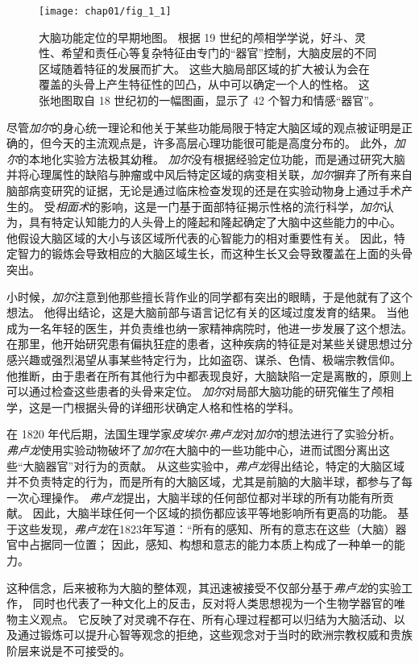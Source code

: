 \begin{figure}[htbp]
	\centering
	\texttt{[image: chap01/fig\_1\_1]}
	\caption{大脑功能定位的早期地图。
		根据 19 世纪的颅相学学说，好斗、灵性、希望和责任心等复杂特征由专门的“器官”控制，大脑皮层的不同区域随着特征的发展而扩大。
		这些大脑局部区域的扩大被认为会在覆盖的头骨上产生特征性的凹凸，从中可以确定一个人的性格。
		这张地图取自 18 世纪初的一幅图画，显示了 42 个智力和情感“器官”。}
	\label{fig:1_1}
\end{figure}


尽管\textit{加尔}的身心统一理论和他关于某些功能局限于特定大脑区域的观点被证明是正确的，但今天的主流观点是，许多高层心理功能很可能是高度分布的。
此外，\textit{加尔}的本地化实验方法极其幼稚。
\textit{加尔}没有根据经验定位功能，而是通过研究大脑并将心理属性的缺陷与肿瘤或中风后特定区域的病变相关联，\textit{加尔}摒弃了所有来自脑部病变研究的证据，无论是通过临床检查发现的还是在实验动物身上通过手术产生的。
受\textit{相面术}的影响，这是一门基于面部特征揭示性格的流行科学，\textit{加尔}认为，具有特定认知能力的人头骨上的隆起和隆起确定了大脑中这些能力的中心。
他假设大脑区域的大小与该区域所代表的心智能力的相对重要性有关。
因此，特定智力的锻炼会导致相应的大脑区域生长，而这种生长又会导致覆盖在上面的头骨突出。


小时候，\textit{加尔}注意到他那些擅长背作业的同学都有突出的眼睛，于是他就有了这个想法。
他得出结论，这是大脑前部与语言记忆有关的区域过度发育的结果。
当他成为一名年轻的医生，并负责维也纳一家精神病院时，他进一步发展了这个想法。
在那里，他开始研究患有偏执狂症的患者，这种疾病的特征是对某些关键思想过分感兴趣或强烈渴望从事某些特定行为，比如盗窃、谋杀、色情、极端宗教信仰。
他推断，由于患者在所有其他行为中都表现良好，大脑缺陷一定是离散的，原则上可以通过检查这些患者的头骨来定位。
\textit{加尔}对局部大脑功能的研究催生了颅相学，这是一门根据头骨的详细形状确定人格和性格的学科。


在 1820 年代后期，法国生理学家\textit{皮埃尔$\cdot$弗卢龙}对\textit{加尔}的想法进行了实验分析。 
\textit{弗卢龙}使用实验动物破坏了\textit{加尔}在大脑中的一些功能中心，进而试图分离出这些“大脑器官”对行为的贡献。
从这些实验中，\textit{弗卢龙}得出结论，特定的大脑区域并不负责特定的行为，而是所有的大脑区域，尤其是前脑的大脑半球，都参与了每一次心理操作。
\textit{弗卢龙}提出，大脑半球的任何部位都对半球的所有功能有所贡献。
因此，大脑半球任何一个区域的损伤都应该平等地影响所有更高的功能。
基于这些发现，\textit{弗卢龙}在1823年写道：“所有的感知、所有的意志在这些（大脑）器官中占据同一位置；
因此，感知、构想和意志的能力本质上构成了一种单一的能力。


这种信念，后来被称为大脑的整体观，其迅速被接受不仅部分基于\textit{弗卢龙}的实验工作，
同时也代表了一种文化上的反击，反对将人类思想视为一个生物学器官的唯物主义观点。
它反映了对灵魂不存在、所有心理过程都可以归结为大脑活动、以及通过锻炼可以提升心智等观念的拒绝，这些观念对于当时的欧洲宗教权威和贵族阶层来说是不可接受的。

